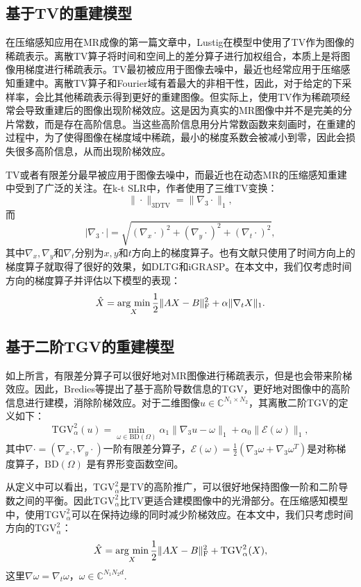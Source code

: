 \subsection{基于TV的重建模型}
在压缩感知应用在MR成像的第一篇文章中，Lustig\cite{Lustig2008Compressed}在模型中使用了TV作为图像的稀疏表示。离散TV算子将时间和空间上的差分算子进行加权组合，本质上是将图像用梯度进行稀疏表示。TV最初被应用于图像去噪中\cite{rof}，最近也经常应用于压缩感知重建中。离散TV算子和Fourier域有着最大的非相干性，因此，对于给定的下采样率，会比其他稀疏表示得到更好的重建图像。但实际上，使用TV作为稀疏项经常会导致重建后的图像出现阶梯效应。这是因为真实的MR图像中并不是完美的分片常数，而是存在高阶信息。当这些高阶信息用分片常数函数来刻画时，在重建的过程中，为了使得图像在梯度域中稀疏，最小的梯度系数会被减小到零，因此会损失很多高阶信息，从而出现阶梯效应。

TV或者有限差分最早被应用于图像去噪中，而最近也在动态MR的压缩感知重建中受到了广泛的关注。在k-t SLR\cite{Sajan2011Accelerated}中，作者使用了三维TV变换：
$$\|\cdot\|_\mathrm{3DTV} = \|\nabla_3\cdot\|_1,$$
而
$$|\nabla_3\cdot|=\sqrt{(\nabla_x \cdot)^2 + (\nabla_y \cdot)^2 + (\nabla_t \cdot)^2},$$
其中$\nabla_x,\nabla_y$和$\nabla_t$分别为$x,y$和$t$方向上的梯度算子。也有文献只使用了时间方向上的梯度算子就取得了很好的效果，如DLTG\cite{caballero2014dictionary}和iGRASP\cite{igrasp}。在本文中，我们仅考虑时间方向的梯度算子并评估以下模型的表现：
\begin{equation}
\hat{X} = \argmin_X \frac{1}{2}\|AX-B\|_\mathrm{F}^2 + \alpha\|\nabla_t X\|_1.
\end{equation}

\subsection{基于二阶TGV的重建模型}
如上所言，有限差分算子可以很好地对MR图像进行稀疏表示，但是也会带来阶梯效应。因此，Bredies\cite{bredies2010total}等提出了基于高阶导数信息的TGV，更好地对图像中的高阶信息进行建模，消除阶梯效应。对于二维图像$u\in \mathbb{C}^{N_1\times N_2}$，其离散二阶TGV的定义如下：
$$\mathrm{TGV}_\alpha^2(u)=\min_{\omega\in \mathrm{BD}(\Omega)}\alpha_1\|\nabla_3 u-\omega\|_1 + \alpha_0\|\mathcal{E}(\omega)\|_1,$$
其中$\nabla\cdot=(\nabla_x\cdot, \nabla_y\cdot)$一阶有限差分算子，$\mathcal{E}(\omega)=\frac{1}{2}(\nabla_3\omega+\nabla_3\omega^{T})$是对称梯度算子，$\mathrm{BD}(\Omega)$ 是有界形变函数空间。

从定义中可以看出，$\mathrm{TGV}_\alpha^2$是TV的高阶推广，可以很好地保持图像一阶和二阶导数之间的平衡。因此$\mathrm{TGV}_\alpha^2$比TV更适合建模图像中的光滑部分。在压缩感知模型中，使用$\mathrm{TGV}_\alpha^2$可以在保持边缘的同时减少阶梯效应。在本文中，我们只考虑时间方向的$\mathrm{TGV}_\alpha^2$：
\begin{equation}
\hat{X} = \argmin_X \frac{1}{2}\|AX-B\|_\mathrm{F}^2+\mathrm{TGV}_\alpha^2(X),
\end{equation}
这里$\nabla \omega = \nabla_t \omega$，$\omega\in \mathbb{C}^{N_1N_2d}$.

